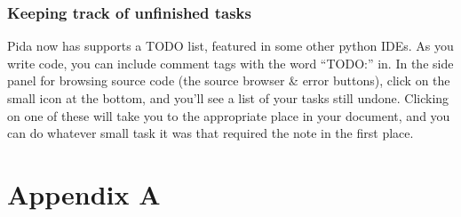 \documentclass[10pt,a4paper,english]{article}
\begin{document}

\hypertarget{keeping-track-of-unfinished-tasks}{}
\subsubsection*{Keeping track of unfinished tasks}

Pida now has supports a TODO list, featured in some other python IDEs. As 
you write code, you can include comment tags with the word ``TODO:'' in. In
the side panel for browsing source code (the source browser {\&} error buttons),
click on the small icon at the bottom, and you'll see a list of your tasks 
still undone. Clicking on one of these will take you to the appropriate place 
in your document, and you can do whatever small task it was that required the
note in the first place.



\hypertarget{appendix-a}{}
\section*{Appendix A}
\end{document}
